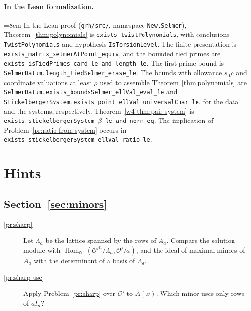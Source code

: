 \documentclass[reqno]{amsart}
\theoremstyle{definition}
\theoremstyle{plain}
\newcommand{\Oc}{\mathcal{O}}
\begin{document}
\paragraph{In the Lean formalization.}
{\sloppy\emergencystretch=8em
In the Lean proof \cite{GL} (\nolinkurl{grh/src/}, namespace \texttt{New.Selmer}),
Theorem~\ref{thm:polynomials} is \texttt{exists\_twistPolynomials}, with conclusions
\texttt{TwistPolynomials} and hypothesis \texttt{IsTorsionLevel}.
The finite presentation is \texttt{exists\_matrix\_selmerAtPoint\_equiv},
and the bounded tied primes are \texttt{exists\_isTiedPrimes\_card\_le\_and\_length\_le}.
The first-prime bound is \texttt{SelmerDatum.length\_tiedSelmer\_erase\_le}.
The bounds with allowance \(s_0\rho\) and coordinate valuations at least \(\rho\) used to assemble Theorem~\ref{thm:polynomials} are
\texttt{SelmerDatum.exists\_boundsSelmer\_ellVal\_eval\_le} and
\texttt{StickelbergerSystem.exists\_point\_ellVal\_universalChar\_le}, for the data and the systems, respectively.
Theorem~\ref{w4-thm:pair-system} is
\texttt{exists\_stickelbergerSystem\_\(\beta\)\_le\_and\_norm\_eq}.
The implication of Problem~\ref{pr:ratio-from-system} occurs in
\texttt{exists\_stickelbergerSystem\_ellVal\_ratio\_le}.\par}

\section*{Hints}

\subsection*{Section~\ref{sec:minors}}
\begin{description}
\item[\ref{pr:sharp}] Let \(\Lambda_a\) be the lattice spanned by the rows of \(A_a\).  Compare the solution module with \(\operatorname{Hom}_{\Oc'}(\Oc'^n/\Lambda_a, \Oc'/a)\), and the ideal of maximal minors of \(A_a\) with the determinant of a basis of \(\Lambda_a\).
\item[\ref{pr:sharp-use}] Apply Problem~\ref{pr:sharp} over \(\Oc'\) to \(A(x)\).  Which minor uses only rows of \(a I_n\)?
\end{description}
\end{document}
